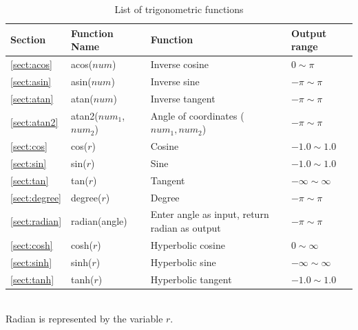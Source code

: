 \begin{table}[!hb]
\begin{center}
\caption{List of trigonometric functions \label{tbl:mcal_sankaku}}
{\small
  \begin{tabular}{l|l|l|l} \hline
Section&Function Name&Function&Output range\\ \hline

\ref{sect:acos}& acos($num$)&
Inverse cosine &
$0\sim\pi$\\

\ref{sect:asin}& asin($num$)&
Inverse sine&
$-\pi\sim\pi$\\

\ref{sect:atan}& atan($num$)&
Inverse tangent&
$-\pi\sim\pi$\\

\ref{sect:atan2}& atan2($num_1$,$num_2$)&
Angle of coordinates ($num_1,num_2$)&
$-\pi\sim\pi$\\

\ref{sect:cos}& cos($r$)&
Cosine&
$-1.0\sim 1.0$\\

\ref{sect:sin}& sin($r$)&
Sine&
$-1.0\sim 1.0$\\

\ref{sect:tan}& tan($r$)&
Tangent&
$-\infty\sim\infty$\\

\ref{sect:degree}& degree($r$)&
Degree&
$-\pi\sim\pi$\\

\ref{sect:radian}& radian(angle)&
Enter angle as input, return radian as output &
$-\pi\sim\pi$\\

\ref{sect:cosh}& cosh($r$)&
Hyperbolic cosine&
$0\sim\infty$\\

\ref{sect:sinh}& sinh($r$)&
Hyperbolic sine&
$-\infty\sim\infty$\\

\ref{sect:tanh}& tanh($r$)&
Hyperbolic tangent&
$-1.0\sim 1.0$\\

\hline
  \end{tabular}
	\\Radian is represented by the variable $r$.
  }
  \end{center}
\end{table}


